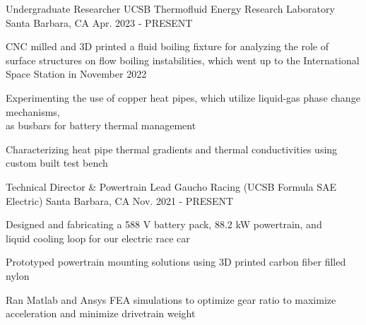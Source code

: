

\begin{cventries}

\cventry
{Undergraduate Researcher} %
{UCSB Thermofluid Energy Research Laboratory} %
{Santa Barbara, CA} %
{Apr. 2023 - PRESENT} %
{ %
\begin{cvitems}   
\item {CNC milled and 3D printed a fluid boiling fixture for analyzing the role of surface structures on flow boiling instabilities, which went up to the International Space Station in November 2022}
\item {Experimenting the use of copper heat pipes, which utilize liquid-gas phase change mechanisms,\\ as busbars for battery thermal management}
\item {Characterizing heat pipe thermal gradients and thermal conductivities using custom built test bench}
\end{cvitems}
}

\cventry
{Technical Director \& Powertrain Lead} %
{Gaucho Racing (UCSB Formula SAE Electric)} %
{Santa Barbara, CA} %
{Nov. 2021 - PRESENT} %
{ %
\begin{cvitems}   
\item {Designed and fabricating a 588 V battery pack, 88.2 kW powertrain, and \\ liquid cooling loop for our electric race car}
\item {Prototyped powertrain mounting solutions using 3D printed carbon fiber filled nylon}
\item {Ran Matlab and Ansys FEA simulations to optimize gear ratio to maximize acceleration and minimize drivetrain weight}
\end{cvitems}
}



\end{cventries}
